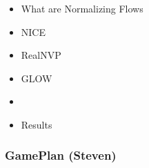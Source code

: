 \begin{frame}
\begin{itemize}
    \item What are Normalizing Flows
    \item NICE
    \item RealNVP
    \item GLOW
    \item \textbf{\color{red}{GamePlan}}
    \item Results
\end{itemize}
\end{frame}

\begin{frame}
    \frametitle{GamePlan (Steven)}
\end{frame}
